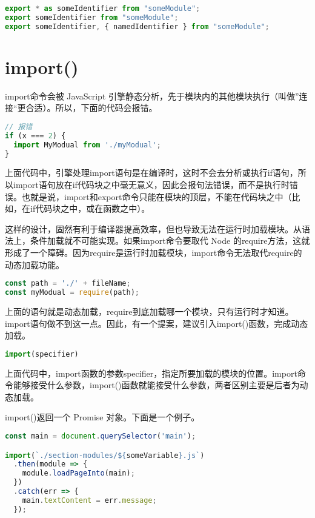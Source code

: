 \begin{lstlisting}[language=JavaScript]
export * as someIdentifier from "someModule";
export someIdentifier from "someModule";
export someIdentifier, { namedIdentifier } from "someModule";
\end{lstlisting}


\section{import()}



import命令会被 JavaScript 引擎静态分析，先于模块内的其他模块执行（叫做”连接“更合适）。所以，下面的代码会报错。


\begin{lstlisting}[language=JavaScript]
// 报错
if (x === 2) {
  import MyModual from './myModual';
}
\end{lstlisting}


上面代码中，引擎处理import语句是在编译时，这时不会去分析或执行if语句，所以import语句放在if代码块之中毫无意义，因此会报句法错误，而不是执行时错误。也就是说，import和export命令只能在模块的顶层，不能在代码块之中（比如，在if代码块之中，或在函数之中）。

这样的设计，固然有利于编译器提高效率，但也导致无法在运行时加载模块。从语法上，条件加载就不可能实现。如果import命令要取代 Node 的require方法，这就形成了一个障碍。因为require是运行时加载模块，import命令无法取代require的动态加载功能。

\begin{lstlisting}[language=JavaScript]
const path = './' + fileName;
const myModual = require(path);
\end{lstlisting}


上面的语句就是动态加载，require到底加载哪一个模块，只有运行时才知道。import语句做不到这一点。因此，有一个提案，建议引入import()函数，完成动态加载。


\begin{lstlisting}[language=JavaScript]
import(specifier)
\end{lstlisting}

上面代码中，import函数的参数specifier，指定所要加载的模块的位置。import命令能够接受什么参数，import()函数就能接受什么参数，两者区别主要是后者为动态加载。

import()返回一个 Promise 对象。下面是一个例子。

\begin{lstlisting}[language=JavaScript]
const main = document.querySelector('main');

import(`./section-modules/${someVariable}.js`)
  .then(module => {
    module.loadPageInto(main);
  })
  .catch(err => {
    main.textContent = err.message;
  });
\end{lstlisting}


